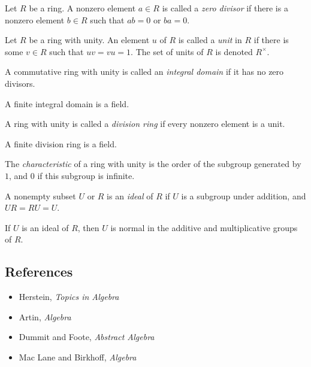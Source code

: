 \begin{defn}
    Let $R$ be a ring. A nonzero element $a\in R$ is called a \emph{zero
    divisor} if there is a nonzero element $b\in R$ such that $ab=0$ or $ba=0$.
\end{defn}
\begin{defn}
    Let $R$ be a ring with unity. An element $u$ of $R$ is called a \emph{unit}
    in $R$ if there is some $v\in R$ such that $uv=vu=1$. The set of units of
    $R$ is denoted $R^\times$.
\end{defn}
\begin{defn}
    A commutative ring with unity is called an \emph{integral domain} if it has
    no zero divisors.
\end{defn}
\begin{prop}
    A finite integral domain is a field.
\end{prop}
\begin{defn}
    A ring with unity is called a \emph{division ring} if every nonzero element
    is a unit.
\end{defn}
\begin{prop}
    A finite division ring is a field.
\end{prop}
\begin{defn}
    The \emph{characteristic} of a ring with unity is the order of the subgroup
    generated by $1$, and $0$ if this subgroup is infinite.
\end{defn}
\begin{defn}
    A nonempty subset $U$ or $R$ is an \emph{ideal} of $R$ if $U$ is a subgroup
    under addition, and $UR=RU=U$.
\end{defn}
\begin{prop}
    If $U$ is an ideal of $R$, then $U$ is normal in the additive and
    multiplicative groups of $R$.
\end{prop}
\subsection*{References}
\begin{itemize}
    \item Herstein, \emph{Topics in Algebra}
    \item Artin, \emph{Algebra}
    \item Dummit and Foote, \emph{Abstract Algebra}
    \item Mac Lane and Birkhoff, \emph{Algebra}
\end{itemize}
